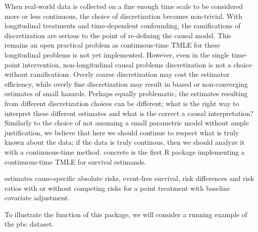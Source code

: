 \documentclass{report}
\newcommand{\1}{\ensuremath{\mathbf{1}}}
\begin{document}
When real-world data is collected on a fine enough time scale to be considered more or less continuous, the choice of discretization becomes non-trivial. With longitudinal treatments and time-dependent confounding, the ramifications of discretization are serious to the point of re-defining the causal model. This remains an open practical problem as continuous-time TMLE for these longitudinal problems is not yet implemented. However, even in the single time-point intervention, non-longitudinal causal problems discretization is not a choice without ramifications. Overly coarse discretization may cost the estimator efficiency, while overly fine discretization may result in biased or non-converging estimates of small hazards. Perhaps equally problematic, the estimates resulting from different discretization choices can be different; what is the right way to interpret these different estimates and what is the correct a causal interpretation? Similarly to the choice of not assuming a small parametric model without ample justification, we believe that here we should continue to respect what is truly known about the data; if the data is truly continous, then we should analyze it with a continuous-time method. concrete is the first R package implementing a continuous-time TMLE for survival estimands.

 estimates cause-specific absolute risks, event-free survival, risk differences and risk ratios with or without competing risks for a point treatment with baseline covariate adjustment.

To illustrate the function of this package, we will consider a running example of the pbc dataset.
\end{document}
